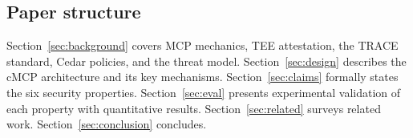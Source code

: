 \subsection*{Paper structure}

Section~\ref{sec:background} covers MCP mechanics, TEE attestation, the TRACE standard,
Cedar policies, and the threat model. Section~\ref{sec:design} describes the cMCP
architecture and its key mechanisms. Section~\ref{sec:claims} formally states the six
security properties. Section~\ref{sec:eval} presents experimental validation of each
property with quantitative results. Section~\ref{sec:related} surveys related work.
Section~\ref{sec:conclusion} concludes.
